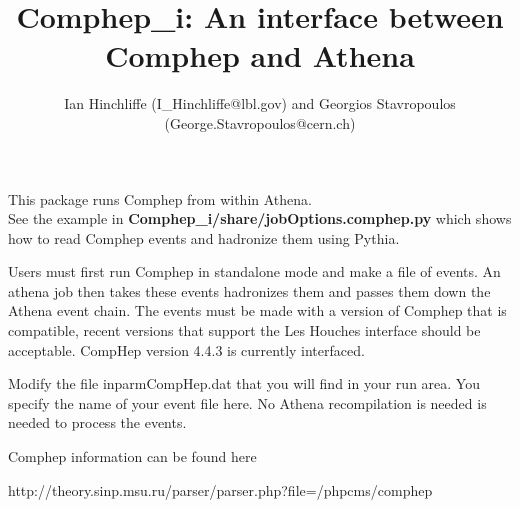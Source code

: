 \documentclass[11pt]{article}
\begin{document}
\title{Comphep\_i: An interface between Comphep and Athena}
\author{  Ian Hinchliffe (I\_Hinchliffe@lbl.gov) and Georgios Stavropoulos (George.Stavropoulos@cern.ch) }

\maketitle           

This package runs Comphep  from within Athena. \\See the example
in {\bf Comphep\_i/share/jobOptions.comphep.py } which shows how to
read Comphep events and hadronize them using Pythia. 

Users must first run 
Comphep in standalone mode and make a file of events. An athena job
then takes these events hadronizes them and passes them down the
Athena event chain. The events must be made with a version of Comphep
that is compatible, recent versions that support the Les Houches
interface should be acceptable. CompHep version 4.4.3 is currently
interfaced.

Modify the file inparmCompHep.dat that
you will find in your run area. You specify the name of your event
file here. No Athena recompilation is needed is needed to process the events.

Comphep information can be found here

http://theory.sinp.msu.ru/parser/parser.php?file=/phpcms/comphep
\end{document}
